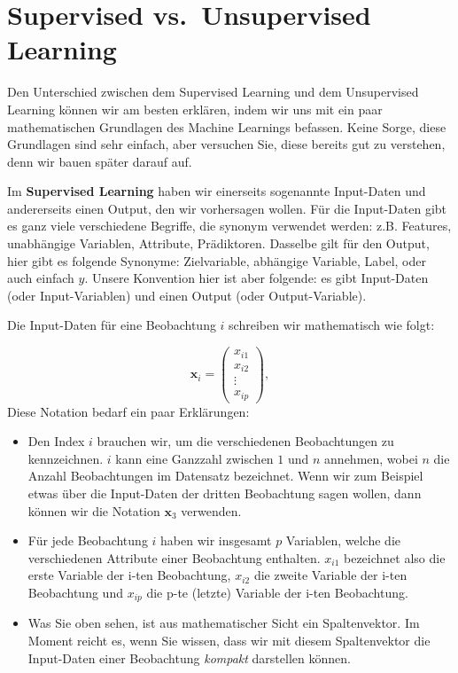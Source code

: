 \documentclass[
]{book}
\providecommand{\tightlist}{%
  \setlength{\itemsep}{0pt}\setlength{\parskip}{0pt}}
\begin{document}
\hypertarget{supervised-vs.-unsupervised-learning}{%
\section{Supervised vs.~Unsupervised Learning}\label{supervised-vs.-unsupervised-learning}}

Den Unterschied zwischen dem Supervised Learning und dem Unsupervised Learning können wir am besten erklären, indem wir uns mit ein paar mathematischen Grundlagen des Machine Learnings befassen. Keine Sorge, diese Grundlagen sind sehr einfach, aber versuchen Sie, diese bereits gut zu verstehen, denn wir bauen später darauf auf.

Im \textbf{Supervised Learning} haben wir einerseits sogenannte Input-Daten und andererseits einen Output, den wir vorhersagen wollen. Für die Input-Daten gibt es ganz viele verschiedene Begriffe, die synonym verwendet werden: z.B. Features, unabhängige Variablen, Attribute, Prädiktoren. Dasselbe gilt für den Output, hier gibt es folgende Synonyme: Zielvariable, abhängige Variable, Label, oder auch einfach \(y\). Unsere Konvention hier ist aber folgende: es gibt Input-Daten (oder Input-Variablen) und einen Output (oder Output-Variable).

Die Input-Daten für eine Beobachtung \(i\) schreiben wir mathematisch wie folgt:

\[
\mathbf{x}_i=\begin{pmatrix} x_{i1} \\ x_{i2} \\ \vdots \\ x_{ip} \end{pmatrix},
\]
Diese Notation bedarf ein paar Erklärungen:

\begin{itemize}
\tightlist
\item
  Den Index \(i\) brauchen wir, um die verschiedenen Beobachtungen zu kennzeichnen. \(i\) kann eine Ganzzahl zwischen \(1\) und \(n\) annehmen, wobei \(n\) die Anzahl Beobachtungen im Datensatz bezeichnet. Wenn wir zum Beispiel etwas über die Input-Daten der dritten Beobachtung sagen wollen, dann können wir die Notation \(\mathbf{x}_3\) verwenden.
\item
  Für jede Beobachtung \(i\) haben wir insgesamt \(p\) Variablen, welche die verschiedenen Attribute einer Beobachtung enthalten. \(x_{i1}\) bezeichnet also die erste Variable der i-ten Beobachtung, \(x_{i2}\) die zweite Variable der i-ten Beobachtung und \(x_{ip}\) die p-te (letzte) Variable der i-ten Beobachtung.
\item
  Was Sie oben sehen, ist aus mathematischer Sicht ein Spaltenvektor. Im Moment reicht es, wenn Sie wissen, dass wir mit diesem Spaltenvektor die Input-Daten einer Beobachtung \emph{kompakt} darstellen können.
\end{itemize}
\end{document}
